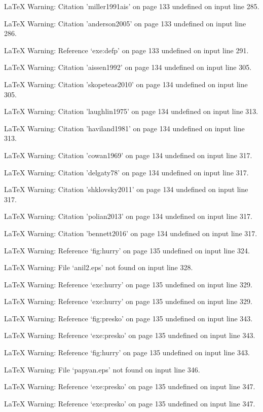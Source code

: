 LaTeX Warning: Citation 'miller1991ais' on page 133 undefined on input line 285.


LaTeX Warning: Citation 'anderson2005' on page 133 undefined on input line 286.


LaTeX Warning: Reference `exe:defp' on page 133 undefined on input line 291.


LaTeX Warning: Citation 'aissen1992' on page 134 undefined on input line 305.


LaTeX Warning: Citation 'skopeteas2010' on page 134 undefined on input line 305.


LaTeX Warning: Citation 'laughlin1975' on page 134 undefined on input line 313.


LaTeX Warning: Citation 'haviland1981' on page 134 undefined on input line 313.


LaTeX Warning: Citation 'cowan1969' on page 134 undefined on input line 317.


LaTeX Warning: Citation 'delgaty78' on page 134 undefined on input line 317.


LaTeX Warning: Citation 'shklovsky2011' on page 134 undefined on input line 317.


LaTeX Warning: Citation 'polian2013' on page 134 undefined on input line 317.


LaTeX Warning: Citation 'bennett2016' on page 134 undefined on input line 317.


LaTeX Warning: Reference `fig:hurry' on page 135 undefined on input line 324.


LaTeX Warning: File `anil2.eps' not found on input line 328.




LaTeX Warning: Reference `exe:hurry' on page 135 undefined on input line 329.


LaTeX Warning: Reference `exe:hurry' on page 135 undefined on input line 329.


LaTeX Warning: Reference `fig:presko' on page 135 undefined on input line 343.


LaTeX Warning: Reference `exe:presko' on page 135 undefined on input line 343.


LaTeX Warning: Reference `fig:hurry' on page 135 undefined on input line 343.


LaTeX Warning: File `papyan.eps' not found on input line 346.




LaTeX Warning: Reference `exe:presko' on page 135 undefined on input line 347.


LaTeX Warning: Reference `exe:presko' on page 135 undefined on input line 347.


